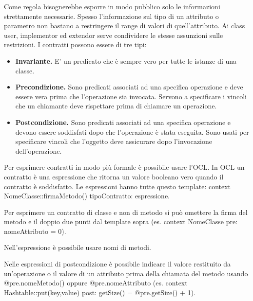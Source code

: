 \documentclass{article}
\begin{document}
        \vspace{3mm}
        
        Come regola bisognerebbe esporre in modo pubblico solo le informazioni strettamente necessarie. Spesso l’informazione sul tipo di un attributo o parametro non bastano a restringere il range di valori di quell’attributo. Ai class user, implementor ed extendor serve condividere le stesse assunzioni sulle restrizioni. I contratti possono essere di tre tipi:
        
        \begin{itemize}
            \item \textbf{Invariante.} E’ un predicato che è sempre vero per tutte le istanze di una classe.
            
            \item \textbf{Precondizione.} Sono predicati associati ad una specifica operazione e deve essere vera prima che l’operazione sia invocata. Servono a specificare i vincoli che un chiamante deve rispettare prima di chiamare un operazione.
            
            \item \textbf{Postcondizione.} Sono predicati associati ad una specifica operazione e devono essere soddisfati dopo che l’operazione è stata eseguita. Sono usati per specificare vincoli che l’oggetto deve assicurare dopo l’invocazione dell’operazione.
        \end{itemize}
        
        Per esprimere contratti in modo più formale è possibile usare l’OCL. In OCL un contratto è una espressione che ritorna un valore booleano vero quando il contratto è soddisfatto. Le espressioni hanno tutte questo template: context NomeClasse::firmaMetodo() tipoContratto: espressione. 
        
        \vspace{3mm}
        
        Per esprimere un contratto di classe e non di metodo si può omettere la firma del metodo e il doppio due punti dal template sopra (es. context NomeClasse pre: nomeAttributo = 0). 
        
        Nell’espressione è possibile usare nomi di metodi.
        
        Nelle espressioni di postcondizione è possibile indicare il valore restituito da un’operazione o il valore di un attributo prima della chiamata del metodo usando @pre.nomeMetodo() oppure @pre.nomeAttributo (es. context Hashtable::put(key,value) post: getSize() = @pre.getSize() + 1). 
        
\end{document}
